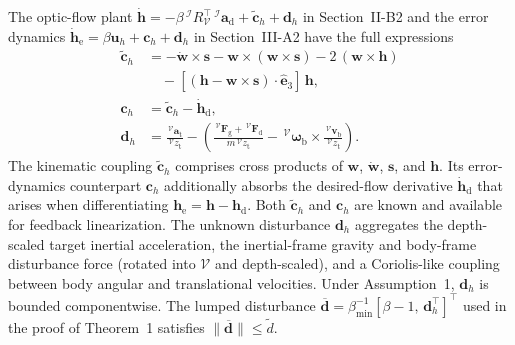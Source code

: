 \documentclass[10pt,journal]{IEEEtran}
\begin{document}
The optic-flow plant $\dot{\boldsymbol{h}} = -\beta\,^\mathcal{I}R_\mathcal{V}^\top\,^\mathcal{I}\boldsymbol{a}_\text{d} + \tilde{\boldsymbol{c}}_h + \boldsymbol{d}_h$ in Section~II-B2 and the error dynamics $\dot{\boldsymbol{h}}_\text{e} = \beta\boldsymbol{u}_h + \boldsymbol{c}_h + \boldsymbol{d}_h$ in Section~III-A2 have the full expressions
\begin{align}
\tilde{\boldsymbol{c}}_h &= -\dot{\boldsymbol{w}}\times\boldsymbol{s} - \boldsymbol{w}\times(\boldsymbol{w}\times\boldsymbol{s}) - 2\,(\boldsymbol{w}\times\boldsymbol{h}) \nonumber \\
&\quad - [(\boldsymbol{h}-\boldsymbol{w}\times\boldsymbol{s})\cdot\hat{\boldsymbol{e}}_3]\,\boldsymbol{h}, \label{sup:c_tilde_h} \\
\boldsymbol{c}_h &= \tilde{\boldsymbol{c}}_h - \dot{\boldsymbol{h}}_\text{d}, \label{sup:c_h} \\
\boldsymbol{d}_h &= \frac{\,^\mathcal{V}\boldsymbol{a}_\text{t}}{\,^\mathcal{V}z_\text{t}} - \left(\frac{\,^\mathcal{V}\boldsymbol{F}_\text{g}+\,^\mathcal{V}\boldsymbol{F}_\text{d}}{m\,^\mathcal{V}z_\text{t}} - \,^\mathcal{V}\boldsymbol{\omega}_\text{b}\times\frac{\,^\mathcal{V}\boldsymbol{v}_\text{b}}{\,^\mathcal{V}z_\text{t}}\right). \label{sup:d_h}
\end{align}
The kinematic coupling $\tilde{\boldsymbol{c}}_h$ comprises cross products of $\boldsymbol{w}$, $\dot{\boldsymbol{w}}$, $\boldsymbol{s}$, and $\boldsymbol{h}$. Its error-dynamics counterpart $\boldsymbol{c}_h$ additionally absorbs the desired-flow derivative $\dot{\boldsymbol{h}}_\text{d}$ that arises when differentiating $\boldsymbol{h}_\text{e}=\boldsymbol{h}-\boldsymbol{h}_\text{d}$. Both $\tilde{\boldsymbol{c}}_h$ and $\boldsymbol{c}_h$ are known and available for feedback linearization. The unknown disturbance $\boldsymbol{d}_h$ aggregates the depth-scaled target inertial acceleration, the inertial-frame gravity and body-frame disturbance force (rotated into $\mathcal{V}$ and depth-scaled), and a Coriolis-like coupling between body angular and translational velocities. Under Assumption~1, $\boldsymbol{d}_h$ is bounded componentwise. The lumped disturbance $\boldsymbol{\overline{d}}=\beta_{\min}^{-1}[\beta-1,\,\boldsymbol{d}_h^\top]^\top$ used in the proof of Theorem~1 satisfies $\|\boldsymbol{\overline{d}}\|\le\tilde{d}$.
\end{document}
